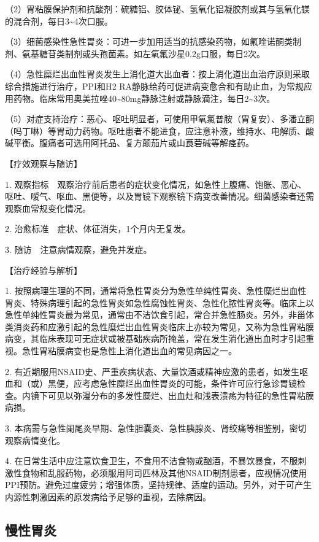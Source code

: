 （2）胃粘膜保护剂和抗酸剂：硫糖铝、胶体铋、氢氧化铝凝胶剂或其与氢氧化镁的混合剂，每日3\textasciitilde{}4次口服。

（3）细菌感染性急性胃炎：可进一步加用适当的抗感染药物，如氟喹诺酮类制剂、氨基糖苷类制剂或头孢菌素。如左氧氟沙星0.2g口服，每日2次。

（4）急性糜烂出血性胃炎发生上消化道大出血者：按上消化道出血治疗原则采取综合措施进行治疗，PPI和H{2}
RA静脉给药可促进病变愈合和有助止血，为常规应用药物。临床常用奥美拉唑40\textasciitilde{}80mg静脉注射或静脉滴注，每日2\textasciitilde{}3次。

（5）对症支持治疗：恶心、呕吐明显者，可使用甲氧氯普胺（胃复安）、多潘立酮（吗丁啉）等胃动力药物。呕吐患者不能进食，应注意补液，维持水、电解质、酸碱平衡。腹痛者可选用阿托品、复方颠茄片或山莨菪碱等解痉药。

【疗效观察与随访】

1.
观察指标　观察治疗前后患者的症状变化情况，如急性上腹痛、饱胀、恶心、呕吐、嗳气、呕血、黑便等，以及胃镜下观察镜下病变改善情况。细菌感染者还需观察血常规变化情况。

2. 治愈标准　症状、体征消失，1个月内无复发。

3. 随访　注意病情观察，避免并发症。

【治疗经验与解析】

1.
按照病理生理的不同，通常将急性胃炎分为急性单纯性胃炎、急性糜烂出血性胃炎、特殊病理引起的急性胃炎如急性腐蚀性胃炎、急性化脓性胃炎等。临床上以急性单纯性胃炎最为常见，通常由不洁饮食引起，常合并急性肠炎。另外，非甾体类消炎药和应激引起的急性糜烂出血性胃炎临床上亦较为常见，又称为急性胃粘膜病变，其临床表现可无症状或被基础疾病所掩盖，常在发生消化道出血时才引起重视。急性胃粘膜病变也是急性上消化道出血的常见病因之一。

2.
有近期服用NSAID史、严重疾病状态、大量饮酒或精神应激的患者，如发生呕血和（或）黑便，应考虑急性糜烂出血性胃炎的可能，条件许可应行急诊胃镜检查。内镜下可见以弥漫分布的多发性糜烂、出血灶和浅表溃疡为特征的急性胃粘膜病损。

3.
本病需与急性阑尾炎早期、急性胆囊炎、急性胰腺炎、肾绞痛等相鉴别，密切观察病情变化。

4.
在日常生活中应注意饮食卫生，不食用不洁食物或酗酒，不暴饮暴食，不服刺激性食物和乱服药物，必须服用阿司匹林及其他NSAID制剂患者，应视情况使用PPI预防。避免过度疲劳；增强体质，坚持规律、适度的运动。另外，对于可产生内源性刺激因素的原发病给予足够的重视，去除病因。


\subsection{慢性胃炎}

